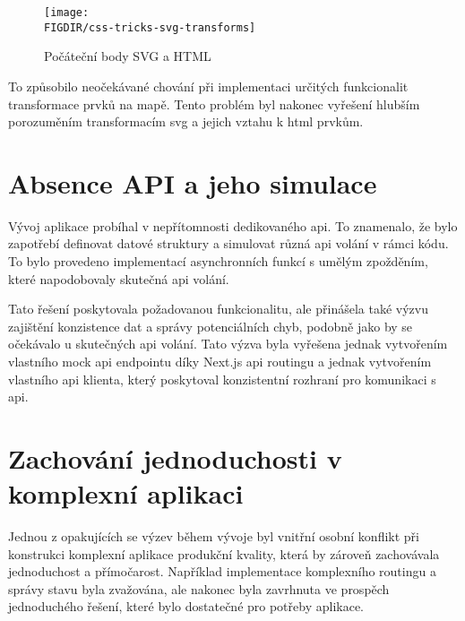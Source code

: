 \begin{figure}[H]
    \centering
    \caption{Počáteční body SVG a HTML}
    \texttt{[image: \\FIGDIR/css-tricks-svg-transforms]}
    \label{fig:css-tricks-svg-transforms}
\end{figure}

To způsobilo neočekávané chování při implementaci určitých funkcionalit transformace prvků na mapě.
Tento problém byl nakonec vyřešení hlubším porozuměním transformacím \ac{svg} a jejich vztahu k \ac{html} prvkům.



\section{Absence API a jeho simulace}
\label{sec:vyzvy-a-problemy-absence-api}
Vývoj aplikace probíhal v nepřítomnosti dedikovaného \ac{api}.
To znamenalo, že bylo zapotřebí definovat datové struktury a simulovat různá \ac{api} volání v rámci kódu.
To bylo provedeno implementací asynchronních funkcí s umělým zpožděním, které napodobovaly skutečná \ac{api} volání.

Tato řešení poskytovala požadovanou funkcionalitu, ale přinášela také výzvu zajištění konzistence dat a správy potenciálních chyb, podobně jako by se očekávalo u skutečných \ac{api} volání.
Tato výzva byla vyřešena jednak vytvořením vlastního mock \ac{api} endpointu díky Next.js \ac{api} routingu\cite{n_basics_api_routes} a jednak vytvořením vlastního \ac{api} klienta, který poskytoval konzistentní rozhraní pro komunikaci s \ac{api}.



\section{Zachování jednoduchosti v komplexní aplikaci}
\label{sec:vyzvy-a-problemy-zachovani-jednoduchosti}
Jednou z opakujících se výzev během vývoje byl vnitřní osobní konflikt při konstrukci komplexní aplikace produkční kvality, která by zároveň zachovávala jednoduchost a přímočarost.
Například implementace komplexního routingu a správy stavu byla zvažována, ale nakonec byla zavrhnuta ve prospěch jednoduchého řešení, které bylo dostatečné pro potřeby aplikace.

